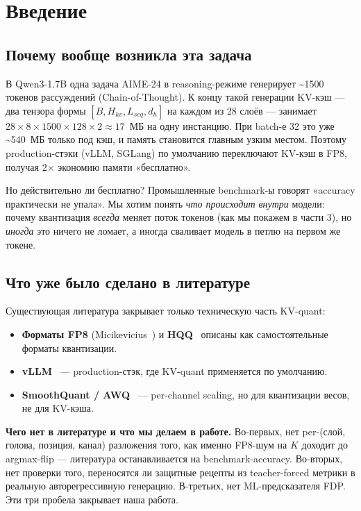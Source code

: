 \documentclass[a4paper,12pt]{article}
\begin{document}
\section{Введение}

\subsection{Почему вообще возникла эта задача}

В Qwen3-1.7B одна задача AIME-24 в reasoning-режиме генерирует
\textasciitilde 1500 токенов рассуждений (Chain-of-Thought). К концу
такой генерации KV-кэш --- два тензора формы $[B, H_{kv}, L_{seq}, d_h]$
на каждом из 28 слоёв --- занимает
$28 \times 8 \times 1500 \times 128 \times 2 \approx 17$~МБ на одну
инстанцию. При batch-е 32 это уже \textasciitilde 540~МБ только под
кэш, и память становится главным узким местом. Поэтому
production-стэки (vLLM, SGLang) по умолчанию переключают KV-кэш в FP8,
получая 2$\times$ экономию памяти «бесплатно».

Но действительно ли бесплатно? Промышленные benchmark-ы говорят
«accuracy практически не упала». Мы хотим понять \textit{что
происходит внутри} модели: почему квантизация \textit{всегда} меняет
поток токенов (как мы покажем в части 3), но \textit{иногда} это
ничего не ломает, а иногда сваливает модель в петлю на первом же
токене.

\subsection{Что уже было сделано в литературе}

Существующая литература закрывает только техническую часть KV-quant:

\begin{itemize}[leftmargin=*]
\item \textbf{Форматы FP8} (Micikevicius~\cite{micikevicius2022}) и
  \textbf{HQQ}~\cite{badri2023} описаны как самостоятельные форматы
  квантизации.
\item \textbf{vLLM}~\cite{kwon2023} --- production-стэк, где KV-quant
  применяется по умолчанию.
\item \textbf{SmoothQuant / AWQ}~\cite{xiao2023smoothquant,lin2024awq}
  --- per-channel scaling, но для квантизации весов, не для KV-кэша.
\end{itemize}

\textbf{Чего нет в литературе и что мы делаем в работе.}
Во-первых, нет per-(слой, голова, позиция, канал) разложения того,
как именно FP8-шум на $K$ доходит до argmax-flip --- литература
останавливается на benchmark-accuracy. Во-вторых, нет проверки того,
переносятся ли защитные рецепты из teacher-forced метрики в реальную
авторегрессивную генерацию. В-третьих, нет ML-предсказателя FDP. Эти
три пробела закрывает наша работа.
\end{document}
